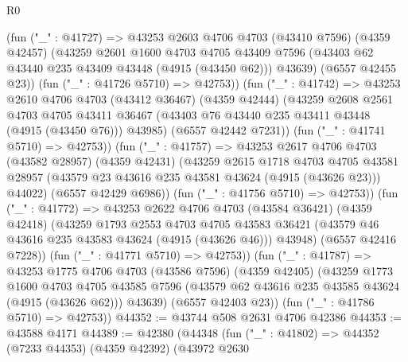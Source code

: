 \begin{lexlean}{R0}
\begin{coremodule}
              (fun ("_" : @41727) =>
              @43253
                @2603
                @4706
                @4703
                (@43410 @7596)
                (@4359 @42457)
                (@43259
                  @2601
                  @1600
                  @4703
                  @4705
                  @43409
                  @7596
                  (@43403 @62 @43440 @235 @43409 @43448 (@4915 (@43450 @62)))
                  @43639)
                (@6557 @42455 @23))
              (fun ("_" : @41726 @5710) => @42753))
            (fun ("_" : @41742) =>
            @43253
              @2610
              @4706
              @4703
              (@43412 @36467)
              (@4359 @42444)
              (@43259
                @2608
                @2561
                @4703
                @4705
                @43411
                @36467
                (@43403 @76 @43440 @235 @43411 @43448 (@4915 (@43450 @76)))
                @43985)
              (@6557 @42442 @7231))
            (fun ("_" : @41741 @5710) => @42753))
          (fun ("_" : @41757) =>
          @43253
            @2617
            @4706
            @4703
            (@43582 @28957)
            (@4359 @42431)
            (@43259
              @2615
              @1718
              @4703
              @4705
              @43581
              @28957
              (@43579 @23 @43616 @235 @43581 @43624 (@4915 (@43626 @23)))
              @44022)
            (@6557 @42429 @6986))
          (fun ("_" : @41756 @5710) => @42753))
        (fun ("_" : @41772) =>
        @43253
          @2622
          @4706
          @4703
          (@43584 @36421)
          (@4359 @42418)
          (@43259
            @1793
            @2553
            @4703
            @4705
            @43583
            @36421
            (@43579 @46 @43616 @235 @43583 @43624 (@4915 (@43626 @46)))
            @43948)
          (@6557 @42416 @7228))
        (fun ("_" : @41771 @5710) => @42753))
      (fun ("_" : @41787) =>
      @43253
        @1775
        @4706
        @4703
        (@43586 @7596)
        (@4359 @42405)
        (@43259
          @1773
          @1600
          @4703
          @4705
          @43585
          @7596
          (@43579 @62 @43616 @235 @43585 @43624 (@4915 (@43626 @62)))
          @43639)
        (@6557 @42403 @23))
      (fun ("_" : @41786 @5710) => @42753))
@44352 := @43744 @508 @2631 @4706 @42386
@44353 := @43588 @4171
@44389 := @42380
    (@44348
      (fun ("_" : @41802) =>
      @44352
        (@7233 @44353)
        (@4359 @42392)
        (@43972
          @2630

\end{coremodule}
\end{lexlean}
